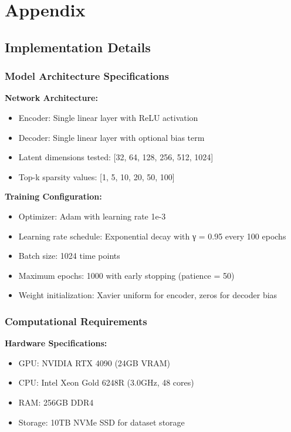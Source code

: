 \section{Appendix}

\subsection{Implementation Details}

\subsubsection{Model Architecture Specifications}

\textbf{Network Architecture:}
\begin{itemize}
\item Encoder: Single linear layer with ReLU activation
\item Decoder: Single linear layer with optional bias term
\item Latent dimensions tested: [32, 64, 128, 256, 512, 1024]
\item Top-k sparsity values: [1, 5, 10, 20, 50, 100]
\end{itemize}

\textbf{Training Configuration:}
\begin{itemize}
\item Optimizer: Adam with learning rate 1e-3
\item Learning rate schedule: Exponential decay with γ = 0.95 every 100 epochs
\item Batch size: 1024 time points
\item Maximum epochs: 1000 with early stopping (patience = 50)
\item Weight initialization: Xavier uniform for encoder, zeros for decoder bias
\end{itemize}

\subsubsection{Computational Requirements}

\textbf{Hardware Specifications:}
\begin{itemize}
\item GPU: NVIDIA RTX 4090 (24GB VRAM)
\item CPU: Intel Xeon Gold 6248R (3.0GHz, 48 cores)
\item RAM: 256GB DDR4
\item Storage: 10TB NVMe SSD for dataset storage
\end{itemize}

